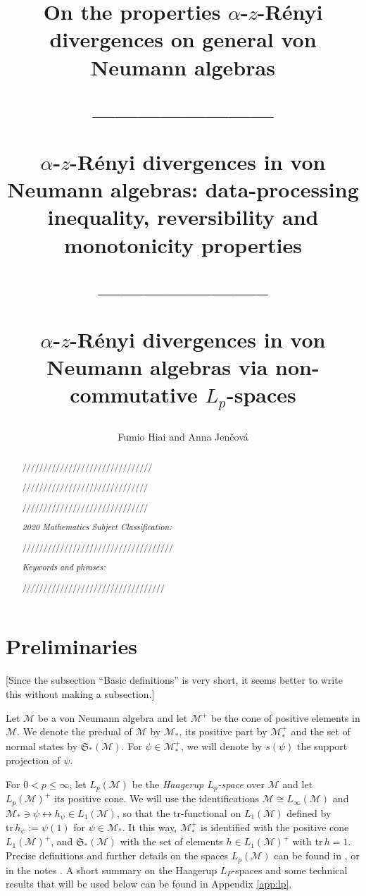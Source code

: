 \documentclass[12pt]{article}
\title{On the properties $\alpha$-$z$-R\'enyi divergences on general von Neumann algebras

{\color{red}
------------------------

$\alpha$-$z$-R\'enyi divergences in von Neumann algebras:
data-processing inequality, reversibility and monotonicity properties

-----------------------

$\alpha$-$z$-R\'enyi divergences in von Neumann algebras via non-commutative $L_p$-spaces
}}
\author{Fumio Hiai and Anna Jen\v cov\'a}
\theoremstyle{definition}
\theoremstyle{remark}
\numberwithin{equation}{section}
\def\Me{\mathcal M}
\def\Tr{\mathrm{tr}}
\def\states {\mathfrak S}
\begin{document}
\maketitle


\begin{abstract}

///////////////////////////////

//////////////////////////////

//////////////////////////////

\bigskip\noindent
{\it 2020 Mathematics Subject Classification:}

////////////////////////////////////

\medskip\noindent
{\it Keywords and phrases:}

//////////////////////////////////

\end{abstract}


\tableofcontents




\section{Preliminaries}


{\color{red}[Since the subsection ``Basic definitions'' is very short, it seems better to write this
without making a subsection.]}

Let $\Me$ be a von Neumann algebra and let $\Me^+$ be the cone of positive elements in $\Me$. We
denote the predual of $\Me$ by $\Me_*$, its positive part by $\Me_*^+$ and the set of normal states by
$\states_*(\Me)$. For $\psi\in \Me_*^+$, we will denote by $s(\psi)$ the support projection  of $\psi$.

For $0< p\le \infty$, let $L_p(\Me)$ be the \emph{Haagerup $L_p$-space}
\cite{haagerup1979lpspaces,terp1981lpspaces} over $\Me$ and let $L_p(\Me)^+$ its positive cone. We will
use the identifications $\Me\cong L_\infty(\Me)$ and $\Me_*\ni \psi \leftrightarrow h_\psi\in L_1(\Me)$,
so that the $\Tr$-functional on $L_1(\Me)$ defined by $\Tr\,h_\psi:=\psi(1)$ for $\psi\in \Me_*$. It this way,
$\Me_*^+$ is identified with the positive cone $L_1(\Me)^+$, and $\states_*(\Me)$ with the set of elements
$h\in L_1(\Me)^+$ with $\Tr\,h=1$. Precise definitions and further details on the spaces $L_p(\Me)$ can be
found in \cite[Chap.~9]{hiai2021lectures}, or in the notes \cite{terp1981lpspaces}. {\color{red}A short summary
on the Haagerup $L_P$-spaces and} some technical results that will be used below can be found in
Appendix \ref{app:lp}.
\end{document}
